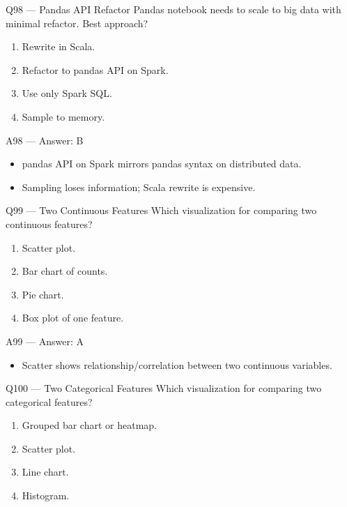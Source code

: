 \documentclass[aspectratio=169,10pt]{beamer}
\begin{document}
	\begin{frame}{Q98 — Pandas API Refactor}
		Pandas notebook needs to scale to big data with minimal refactor. Best approach?
		\begin{enumerate}[label=\Alph*.]
			\item Rewrite in Scala.
			\item Refactor to pandas API on Spark.
			\item Use only Spark SQL.
			\item Sample to memory.
		\end{enumerate}
	\end{frame}
	
	\begin{frame}{A98 — Answer: B}
		\begin{itemize}
			\item pandas API on Spark mirrors pandas syntax on distributed data.
			\item Sampling loses information; Scala rewrite is expensive.
		\end{itemize}
	\end{frame}
	
	\begin{frame}{Q99 — Two Continuous Features}
		Which visualization for comparing two continuous features?
		\begin{enumerate}[label=\Alph*.]
			\item Scatter plot.
			\item Bar chart of counts.
			\item Pie chart.
			\item Box plot of one feature.
		\end{enumerate}
	\end{frame}
	
	\begin{frame}{A99 — Answer: A}
		\begin{itemize}
			\item Scatter shows relationship/correlation between two continuous variables.
		\end{itemize}
	\end{frame}
	
	\begin{frame}{Q100 — Two Categorical Features}
		Which visualization for comparing two categorical features?
		\begin{enumerate}[label=\Alph*.]
			\item Grouped bar chart or heatmap.
			\item Scatter plot.
			\item Line chart.
			\item Histogram.
		\end{enumerate}
	\end{frame}
	
\end{document}
